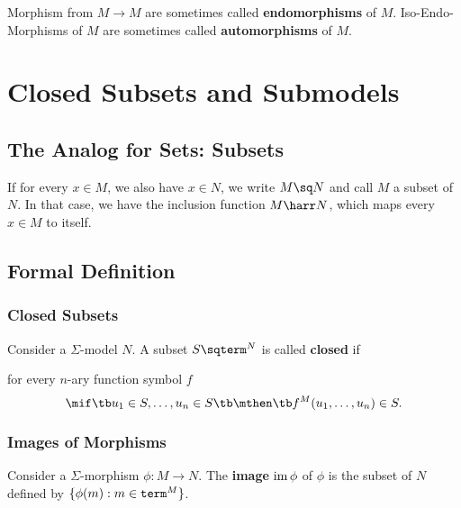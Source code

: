 \begin{terminology}
Morphism from $M\to M$ are sometimes called \textbf{endomorphisms} of $M$.
Iso-Endo-Morphisms of $M$ are sometimes called \textbf{automorphisms} of $M$.
\end{terminology}

\section{Closed Subsets and Submodels}\label{sec:univ:sub}

\subsection{The Analog for Sets: Subsets}

If for every $x\in M$, we also have $x\in N$, we write $M\sq N$ and call $M$ a subset of $N$.
In that case, we have the inclusion function $M\harr N$, which maps every $x\in M$ to itself.

\subsection{Formal Definition}

\subsubsection{Closed Subsets}

\begin{definition}
Consider a $\Sigma$-model $N$.
A subset $S\sq\univ^N$ is called \textbf{closed} if
\begin{compactitem}
 \item for every $n$-ary function symbol $f$
  \[\mif \tb u_1\in S, \ldots,u_n\in S\tb\mthen\tb f^M(u_1,\ldots,u_n)\in S.\]
\end{compactitem}
\end{definition}

\subsubsection{Images of Morphisms}

\begin{definition}[Image]
Consider a $\Sigma$-morphism $\phi:M\to N$.
The \textbf{image} $\mathrm{im}\, \phi$ of $\phi$ is the subset of $N$ defined by $\{\phi(m):m\in\mathtt{term}^M\}$.
\end{definition}


